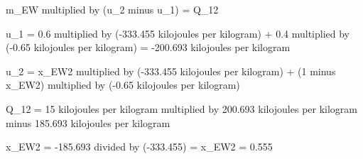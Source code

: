 m_EW multiplied by (u_2 minus u_1) = Q_12  

u_1 = 0.6 multiplied by (-333.455 kilojoules per kilogram) + 0.4 multiplied by (-0.65 kilojoules per kilogram) = -200.693 kilojoules per kilogram  

u_2 = x_EW2 multiplied by (-333.455 kilojoules per kilogram) + (1 minus x_EW2) multiplied by (-0.65 kilojoules per kilogram)  

Q_12 = 15 kilojoules per kilogram multiplied by 200.693 kilojoules per kilogram minus 185.693 kilojoules per kilogram  

x_EW2 = -185.693 divided by (-333.455) = x_EW2 = 0.555